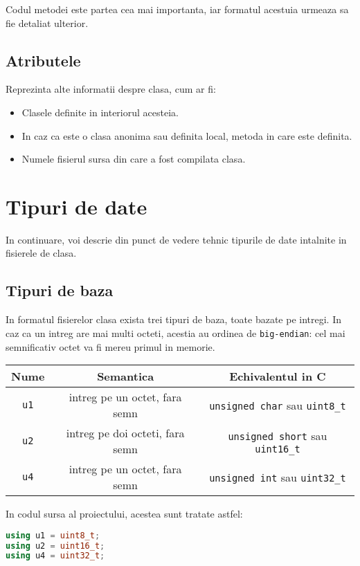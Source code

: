 Codul metodei este partea cea mai importanta, iar formatul acestuia
urmeaza sa fie detaliat ulterior.

\subsection{Atributele}

Reprezinta alte informatii despre clasa, cum ar fi:
\begin{itemize}
    \item Clasele definite in interiorul acesteia.
    \item In caz ca este o clasa anonima sau definita local, metoda in care este definita.
    \item Numele fisierul sursa din care a fost compilata clasa.
\end{itemize}


\section{Tipuri de date}

In continuare, voi descrie din punct de vedere tehnic tipurile de date
intalnite in fisierele de clasa.

\subsection{Tipuri de baza}

In formatul fisierelor clasa exista trei tipuri de baza, toate bazate pe
intregi. In caz ca un intreg are mai multi octeti, acestia au ordinea de
\texttt{big-endian}: cel mai semnificativ octet va fi mereu primul in
memorie.

\begin{longtable}[]{@{}ccc@{}}
\toprule
Nume & Semantica & Echivalentul in C\tabularnewline
\midrule
\endhead
\texttt{u1} & intreg pe un octet, fara semn & \texttt{unsigned\ char}
sau \texttt{uint8\_t}\tabularnewline
\texttt{u2} & intreg pe doi octeti, fara semn & \texttt{unsigned\ short}
sau \texttt{uint16\_t}\tabularnewline
\texttt{u4} & intreg pe un octet, fara semn & \texttt{unsigned\ int} sau
\texttt{uint32\_t}\tabularnewline
\bottomrule
\end{longtable}

In codul sursa al proiectului, acestea sunt tratate astfel:

\begin{lstlisting}[language=C++]
using u1 = uint8_t;
using u2 = uint16_t;
using u4 = uint32_t;
\end{lstlisting}

